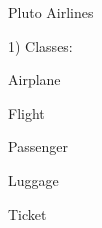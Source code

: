 Pluto Airlines

1) Classes\+:
\begin{DoxyItemize}
\item Airplane
\item Flight
\item Passenger
\item Luggage
\item Ticket 
\end{DoxyItemize}